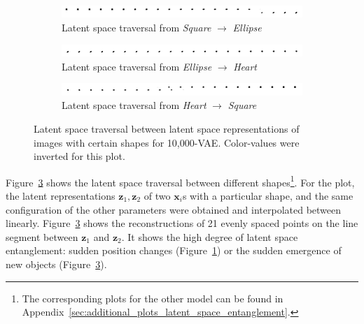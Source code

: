 \begin{figure}
    \centering
    \begin{subfigure}{\textwidth}
        \centering
        \includegraphics[width=\textwidth]{images/latent_space_entanglement/vae_10000_traverse_square_ellipse.png}
        \caption{Latent space traversal from \textit{Square} $\rightarrow$ \textit{Ellipse}}
        \label{subfig:10000_vae_latent_space_traversal_square_to_ellipse}
    \end{subfigure}
    \begin{subfigure}{\textwidth}
        \centering
        \includegraphics[width=\textwidth]{images/latent_space_entanglement/vae_10000_traverse_ellipse_heart.png}
        \caption{Latent space traversal from \textit{Ellipse} $\rightarrow$ \textit{Heart}}
    \end{subfigure}
    \begin{subfigure}{\textwidth}
        \centering
        \includegraphics[width=\textwidth]{images/latent_space_entanglement/vae_10000_traverse_heart_square.png}
        \caption{Latent space traversal from \textit{Heart} $\rightarrow$ \textit{Square}}
        \label{subfig:10000_vae_latent_space_traversal_heart_to_square}
    \end{subfigure}
    \caption[VAE Latent Space Traversal - dsprites]{Latent space traversal between latent space representations of images with certain shapes for 10,000-\ac{VAE}. Color-values were inverted for this plot.}
    \label{fig:10000_vae_latent_space_traversal_shape_to_shape}
\end{figure}

Figure~\ref{fig:10000_vae_latent_space_traversal_shape_to_shape} shows the latent space traversal between different shapes\footnote{The corresponding plots for the other model can be found in Appendix~\ref{sec:additional_plots_latent_space_entanglement}.}.
For the plot, the latent representations $\bm{z}_1, \bm{z}_2$ of two $\bm{x}_i$s with a particular shape, and the same configuration of the other parameters were obtained and interpolated between linearly.
Figure~\ref{fig:10000_vae_latent_space_traversal_shape_to_shape} shows the reconstructions of 21 evenly spaced points on the line segment between $\bm{z}_1$ and $\bm{z}_2$.
It shows the high degree of latent space entanglement: sudden position changes (Figure~\ref{subfig:10000_vae_latent_space_traversal_square_to_ellipse}) or the sudden emergence of new objects (Figure~\ref{fig:10000_vae_latent_space_traversal_shape_to_shape}).

